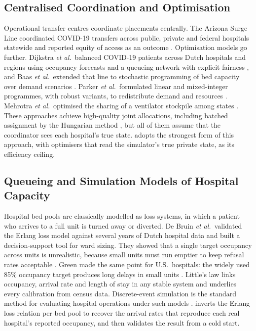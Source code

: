 \subsection{Centralised Coordination and Optimisation}
Operational transfer centres coordinate placements centrally. The Arizona Surge Line coordinated COVID-19 transfers across public, private and federal hospitals statewide and reported equity of access as an outcome \cite{villarroel2023surgeline}. Optimisation models go further. Dijkstra \emph{et al.}\ balanced COVID-19 patients across Dutch hospitals and regions using occupancy forecasts and a queueing network with explicit fairness \cite{dijkstra2023balancing}, and Baas \emph{et al.}\ extended that line to stochastic programming of bed capacity over demand scenarios \cite{baas2023stochastic}. Parker \emph{et al.}\ formulated linear and mixed-integer programmes, with robust variants, to redistribute demand and resources \cite{parker2020redistribution}. Mehrotra \emph{et al.}\ optimised the sharing of a ventilator stockpile among states \cite{mehrotra2020ventilator}. These approaches achieve high-quality joint allocations, including batched assignment by the Hungarian method \cite{kuhn1955hungarian}, but all of them assume that the coordinator sees each hospital's true state. \mahros{} adopts the strongest form of this approach, with optimisers that read the simulator's true private state, as its efficiency ceiling.

\subsection{Queueing and Simulation Models of Hospital Capacity}
Hospital bed pools are classically modelled as loss systems, in which a patient who arrives to a full unit is turned away or diverted. De Bruin \emph{et al.}\ validated the Erlang loss model against several years of Dutch hospital data and built a decision-support tool for ward sizing. They showed that a single target occupancy across units is unrealistic, because small units must run emptier to keep refusal rates acceptable \cite{debruin2010erlang}. Green made the same point for U.S.\ hospitals: the widely used 85\% occupancy target produces long delays in small units \cite{green2002beds}. Little's law \cite{little1961proof} links occupancy, arrival rate and length of stay in any stable system and underlies every calibration from census data. Discrete-event simulation is the standard method for evaluating hospital operations under such models \cite{gunal2010des}. \mahros{} inverts the Erlang loss relation per bed pool to recover the arrival rates that reproduce each real hospital's reported occupancy, and then validates the result from a cold start.

